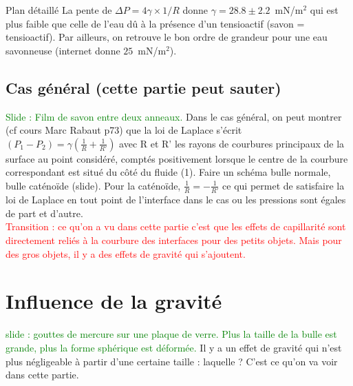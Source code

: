 \begin{reportBlock}{Plan détaillé}
La pente de $\Delta P = 4 \gamma\times 1/R$ donne $\gamma=28.8 \pm 2.2$~mN/m$^2$ qui est plus faible que celle de l'eau dû à la présence d'un tensioactif (savon = tensioactif). Par ailleurs, on retrouve le bon ordre de grandeur pour une eau savonneuse (internet donne $25$~mN/m$^2$). \\

\subsection{Cas général (cette partie peut sauter)}
\textcolor{green}{Slide : Film de savon entre deux anneaux.}
Dans le cas général, on peut montrer (cf cours Marc Rabaut p73) que la loi de Laplace s'écrit $(P_1-P_2)=\gamma\left(\frac{1}{R}+\frac{1}{R'}\right)$ avec R et R' les rayons de courbures principaux de la surface au point considéré, comptés positivement lorsque le centre de la courbure correspondant est situé du côté du fluide (1). Faire un schéma bulle normale, bulle caténoïde (slide). Pour la caténoïde, $\frac{1}{R}=-\frac{1}{R'}$ ce qui permet de satisfaire la loi de Laplace en tout point de l'interface dans le cas ou les pressions sont égales de part et d'autre.\\

\textcolor{red}{Transition : ce qu'on a vu dans cette partie c'est que les effets de capillarité sont directement reliés à la courbure des interfaces pour des petits objets. Mais pour des gros objets, il y a des effets de gravité qui s'ajoutent.}

  \section{Influence de la gravité}
  
  \textcolor{green}{slide : gouttes de mercure sur une plaque de verre. Plus la taille de la bulle est grande, plus la forme sphérique est déformée.}
  Il y a un effet de gravité qui n'est plus négligeable à partir d'une certaine taille : laquelle ? C'est ce qu'on va voir dans cette partie.
  

\end{reportBlock}

